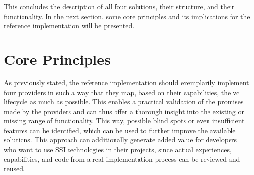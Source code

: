     This concludes the description of all four solutions, their structure, and their functionality. In the next section, some core principles and its implications for the reference implementation will be presented.
    \newpage

	\section{Core Principles}\label{section: core principles}
	
	As previously stated, the reference implementation should exemplarily implement four providers in such a way that they map, based on their capabilities, the \ac{vc} lifecycle as much as possible. This enables a practical validation of the promises made by the providers and can thus offer a thorough insight into the existing or missing range of functionality. This way, possible blind spots or even insufficient features can be identified, which can be used to further improve the available solutions. This approach can additionally generate added value for developers who want to use \ac{SSI} technologies in their projects, since actual experiences, capabilities, and code from a real implementation process can be reviewed and reused.
    
